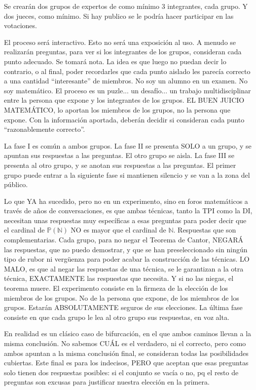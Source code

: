 \noindent
Se crearán dos grupos de expertos de como mínimo 3 integrantes, cada grupo. Y dos jueces, como mínimo. Si hay publico se le podría hacer participar en las votaciones.


\noindent
El proceso será interactivo. Esto no será una exposición al uso. A menudo se realizarán preguntas, para ver si los integrantes de los grupos, consideran cada punto adecuado. Se tomará nota. La idea es que luego no puedan decir lo contrario, o al final, poder recordarles que cada punto aislado les parecía correcto a una cantidad ``interesante'' de miembros. No soy un alumno en un examen. No soy matemático. El proceso es un puzle... un desafío... un trabajo multidisciplinar entre la persona que expone y los integrantes de los grupos. EL BUEN JUICIO MATEMÁTICO, lo aportan los miembros de los grupos, no la persona que expone. Con la información aportada, deberán decidir si consideran cada punto ``razonablemente correcto''.


\noindent
La fase I es común a ambos grupos. La fase II se presenta SOLO a un grupo, y se apuntan sus respuestas a las preguntas. El otro grupo se aisla. La fase III se presenta al otro grupo, y se anotan sus respuestas a las preguntas. El primer grupo puede entrar a la siguiente fase si mantienen silencio y se van a la zona del público.

\noindent
Lo que YA ha sucedido, pero no en un experimento, sino en foros matemáticos a través de años de conversaciones, es que ambas técnicas, tanto la TPI como la DI, necesitan unas respuestas muy específicas a esas preguntas para poder decir que el cardinal de $\mathbb{P(N)}$ NO es mayor que el cardinal de $\mathbb{N}$. Respuestas que son complementarias. Cada grupo, para no negar el Teorema de Cantor, NEGARÁ las respuestas, que no puedo demostrar, y que se han preseleccionado sin ningún tipo de rubor ni vergüenza para poder acabar la construcción de las técnicas.  LO MALO, es que al negar las respuestas de una técnica, se le garantizan a la otra técnica, EXACTAMENTE las respuestas que necesita. Y si no las niegas, el teorema muere. El experimento consiste en la firmeza de la elección de los miembros de los grupos. No de la persona que expone, de los miembros de los grupos. Estarán ABSOLUTAMENTE seguros de sus elecciones. La última fase consiste en que cada grupo le lea al otro grupo sus respuestas, en voz alta.

\noindent
En realidad es un clásico caso de bifurcación, en el que ambos caminos llevan a la misma conclusión. No sabemos CUÁL es el verdadero, ni el correcto, pero como ambos apuntan a la misma conclusión final, se consideran todas las posibilidades cubiertas. Este final es para los indecisos, PERO que aceptan que esas preguntas solo tienen dos respuestas posibles: si el conjunto se vacía o no, pq el resto de preguntas son excusas para justificar nuestra elección en la primera.

